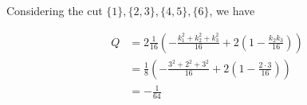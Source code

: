 \documentclass{article}
\begin{document}
Considering the cut \(\{1\}, \{2,3\}, \{4,5\}, \{6\}\), we have

\begin{align*}
    Q &= 2 \frac{1}{16}
        \left(
            -\frac{k_1^2 + k_2^2 + k_3^2}{16}
            + 2 \left( 1 - \frac{k_2 k_3}{16} \right)
         \right)\\
      &= \frac{1}{8}
      \left(
        -\frac{3^2 + 2^2 + 3^2}{16}
        + 2 \left( 1 - \frac{2 \cdot 3}{16} \right)
     \right)\\
     &= -\frac{1}{64}
\end{align*}




\end{document}
